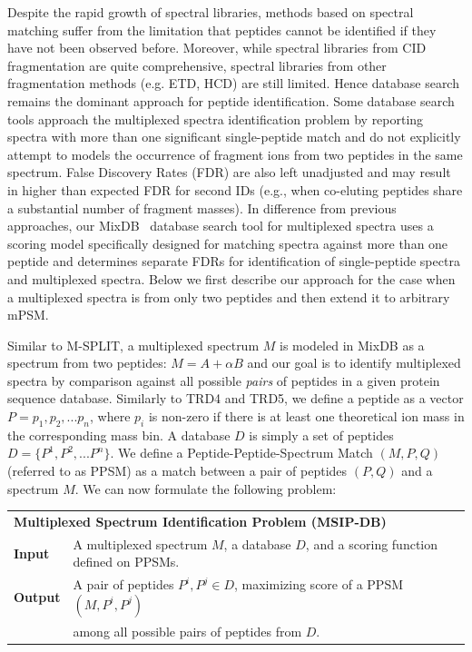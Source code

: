 \documentclass[arial,11pt]{article}
\begin{document}
Despite the rapid growth of spectral libraries, methods based on spectral matching suffer from the limitation that peptides cannot be identified if they have not been observed before. Moreover, while spectral libraries from CID fragmentation are quite comprehensive, spectral libraries from other fragmentation methods (e.g. ETD, HCD) are still limited. Hence database search remains the dominant approach for peptide identification.  Some database search tools approach the multiplexed spectra identification problem by reporting spectra with more than one significant single-peptide match and do not explicitly attempt to models the occurrence of fragment ions from two peptides in the same spectrum.  False Discovery Rates (FDR) are also left unadjusted \cite{zhang2005tree} and may result in higher than expected FDR for second IDs (e.g., when co-eluting peptides share a substantial number of fragment masses). In difference from previous approaches, our  MixDB~\cite{wang2011peptide} database search tool for multiplexed spectra uses a scoring model specifically designed for matching spectra against more than one peptide and determines separate FDRs for identification of single-peptide spectra and multiplexed spectra. Below we first describe our approach for the case when a multiplexed spectra is from only two peptides and then extend it to arbitrary mPSM.

Similar to M-SPLIT, a multiplexed spectrum $M$ is modeled in MixDB as a spectrum from two peptides: $M=A+\alpha B$ and our goal is to identify multiplexed spectra by comparison against all possible \emph{pairs} of peptides in a given protein sequence database. Similarly to TRD4 and TRD5, we define a peptide as a vector $P = {p_{1}, p_{2}, ... p_{n}}$, where $p_{i}$ is non-zero if there is at least one theoretical ion mass in the corresponding mass bin. A database $D$ is simply a set of peptides $D = \{P^{1}, P^{2}, ... P^{n}\}$.  We define a Peptide-Peptide-Spectrum Match $(M,P,Q)$ (referred to as PPSM) as  a match between a pair of peptides $(P,Q)$ and a spectrum $M$. We can now formulate the following problem:\\

\begin{tabular}{ll}
\multicolumn{2}{l}{\textbf{Multiplexed Spectrum Identification Problem (MSIP-DB)}}\\
\textbf{Input}  & A multiplexed spectrum $M$, a database $D$, and a scoring function defined on PPSMs.\\
\textbf{Output} & A pair of peptides ${P^{i}, P^{j}}\in D$,  maximizing score of a PPSM $(M, P^{i}, P^{j})$ \\
& among all possible pairs of peptides from $D$.
\end{tabular}\ \\
\end{document}
